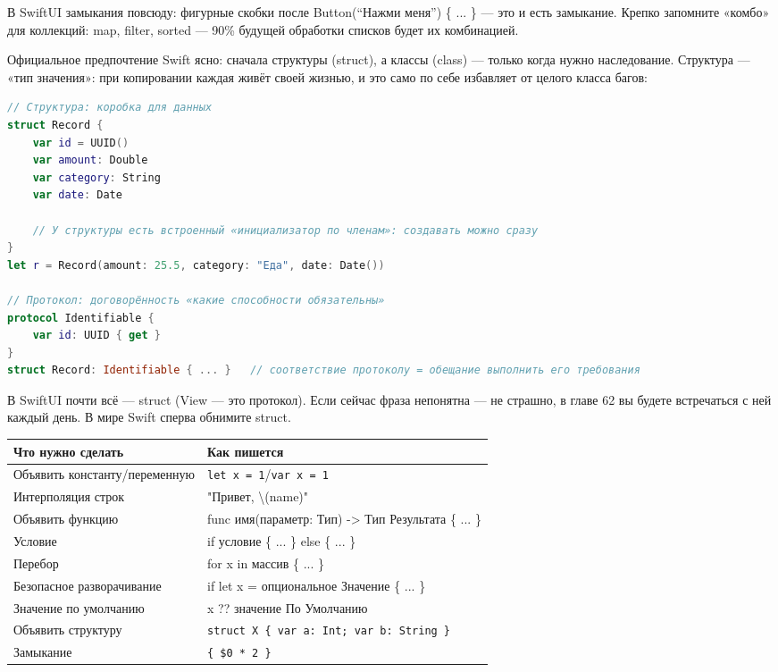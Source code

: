 В SwiftUI замыкания повсюду: фигурные скобки после Button(“Нажми меня”) \{ ... \} — это и есть замыкание. Крепко запомните «комбо» для коллекций: map, filter, sorted — 90\% будущей обработки списков будет их комбинацией.


Официальное предпочтение Swift ясно: сначала структуры (struct), а классы (class) — только когда нужно наследование. Структура — «тип значения»: при копировании каждая живёт своей жизнью, и это само по себе избавляет от целого класса багов:

\begin{lstlisting}[language=Swift]
// Структура: коробка для данных
struct Record {
    var id = UUID()
    var amount: Double
    var category: String
    var date: Date

    // У структуры есть встроенный «инициализатор по членам»: создавать можно сразу
}
let r = Record(amount: 25.5, category: "Еда", date: Date())

// Протокол: договорённость «какие способности обязательны»
protocol Identifiable {
    var id: UUID { get }
}
struct Record: Identifiable { ... }   // соответствие протоколу = обещание выполнить его требования
\end{lstlisting}

В SwiftUI почти всё — struct (View — это протокол). Если сейчас фраза непонятна — не страшно, в главе 62 вы будете встречаться с ней каждый день. В мире Swift сперва обнимите struct.


\begin{center}
\begin{tabularx}{\linewidth}{|X|X|}
\hline
\textbf{Что нужно сделать} & \textbf{Как пишется} \tabularnewline
\hline
Объявить константу/переменную & \texttt{let x = 1}/\texttt{var x = 1} \tabularnewline
Интерполяция строк & "Привет, \textbackslash{}(name)" \tabularnewline
Объявить функцию & func имя(параметр: Тип) -> Тип Результата \{ ... \} \tabularnewline
Условие & if условие \{ ... \} else \{ ... \} \tabularnewline
Перебор & for x in массив \{ ... \} \tabularnewline
Безопасное разворачивание & if let x = опциональное Значение \{ ... \} \tabularnewline
Значение по умолчанию & x ?? значение По Умолчанию \tabularnewline
Объявить структуру & \texttt{struct X \{ var a: Int; var b: String \}} \tabularnewline
Замыкание & \texttt{\{ \$0 * 2 \}} \tabularnewline
\hline
\end{tabularx}
\end{center}

